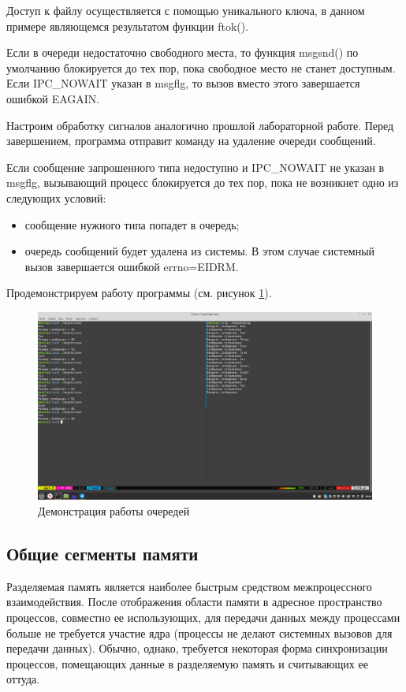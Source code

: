 \documentclass[a4paper,14pt]{extarticle}
\begin{document}
Доступ к файлу осуществляется с помощью уникального ключа, в данном примере являющемся результатом функции ftok().

Если в очереди недостаточно свободного места, то функция msgsnd() по умолчанию блокируется до тех пор, пока свободное место не станет доступным. Если IPC\_NOWAIT указан в msgflg, то вызов вместо этого завершается ошибкой EAGAIN.

Настроим обработку сигналов аналогично прошлой лабораторной работе. Перед завершением, программа отправит команду на удаление очереди сообщений.


Если сообщение запрошенного типа недоступно и IPC\_NOWAIT не указан в msgflg, вызывающий процесс блокируется до тех пор, пока не возникнет одно из следующих условий:
\begin{itemize}
	\item сообщение нужного типа попадет в очередь;
	\item очередь сообщений будет удалена из системы. В этом случае системный вызов завершается ошибкой errno=EIDRM.
\end{itemize}

Продемонстрируем работу программы (см. рисунок \ref{fig:demo1}).
\begin{figure}[h!]
	\centering
	\includegraphics[width=0.9\linewidth]{images/6/demo1}
	\caption{Демонстрация работы очередей}
	\label{fig:demo1}
\end{figure}


\subsection{Общие сегменты памяти}

Разделяемая память является наиболее быстрым средством межпроцессного взаимодействия. После отображения области памяти в адресное пространство процессов, совместно ее использующих, для передачи данных между процессами больше не требуется участие ядра (процессы не делают системных вызовов для передачи данных). Обычно, однако, требуется некоторая форма синхронизации процессов, помещающих данные в разделяемую память и считывающих ее оттуда. 
\end{document}
